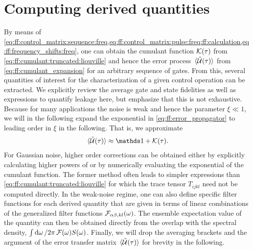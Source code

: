 \section{Computing derived quantities}\label{sec:ff:theory:derived_quantities}
By means of \cref{eq:ff:control_matrix:sequence:freq,eq:ff:control_matrix:pulse:freq:ff:calculation,eq:ff:frequency_shifts:freq}, one can obtain the cumulant function $\mathcal{K}(\tau)$ from \cref{eq:ff:cumulant:truncated:liouville} and hence the error process $\expval*{\mathcal{\tilde{U}}(\tau)}$ from \cref{eq:ff:cumulant_expansion} for an arbitrary sequence of gates.
From this, several quantities of interest for the characterization of a given control operation can be extracted.
We explicitly review the average gate and state fidelities as well as expressions to quantify leakage here, but emphasize that this is not exhaustive.
Because for many applications the noise is weak and hence the parameter $\xi\ll 1$, we will in the following expand the exponential in \cref{eq:ff:error_propagator} to leading order in $\xi$ in the following.
That is, we approximate
\begin{equation}\label{eq:ff:error_transfer_matrix:approx}
    \ev*{\liouvUe(\tau)}\approx\eye + \cumulantfun(\tau).
\end{equation}
For Gaussian noise, higher order corrections can be obtained either by explicitly calculating higher powers of \cumulantfun or by numerically evaluating the exponential of the cumulant function.
The former method often leads to simpler expressions than \cref{eq:ff:cumulant:truncated:liouville} for which the trace tensor $T_{ijkl}$ need not be computed directly.
In the weak-noise regime, one can also define specific filter functions for each derived quantity that are given in terms of linear combinations of the generalized filter functions $\mathcal{F}_{\alpha\beta,kl}(\omega)$.
The ensemble expectation value of the quantity can then be obtained directly from the overlap with the spectral density, $\int\dd{\omega}/2\pi\,\mathcal{F}(\omega) S(\omega)$.
Finally, we will drop the averaging brackets and the argument of the error transfer matrix $\ev*{\liouvUe(\tau)}$ for brevity in the following.

